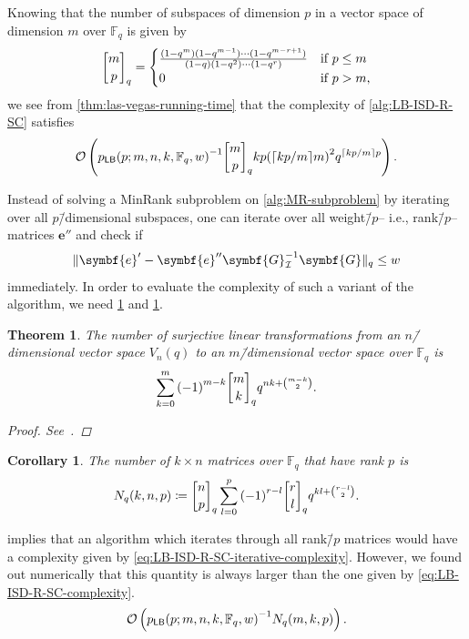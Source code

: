 \documentclass[version=last, paper=A4, parskip=half, oneside]{scrbook}
\theoremstyle{plain}
\newtheorem{theorem}{Theorem}
\newtheorem{corollary}{Corollary}
\theoremstyle{definition}
\theoremstyle{remark}
\renewcommand*{\vec}{\symbf}
\newcommand*{\mat}{\symbf}
\newcommand*{\FF}{\ensuremath{\mathbb{F}}}
\DeclarePairedDelimiter{\ceil}{\lceil}{\rceil}
\DeclarePairedDelimiter{\norm}{\lVert}{\rVert}
\newcommand*{\normR}[2]{\ensuremath{\norm{#1}_{#2}}}
\DeclareRobustCommand{\qbinom}{\genfrac[]{0pt}{}}
\newcommand*{\LB}{\ensuremath{\mathsf{LB}}}
\begin{document}
Knowing that the number of subspaces of dimension \(p\) in a vector space of
dimension \(m\) over \(\FF_q\) is given by
\[
  \qbinom{m}{p}_q =
  \begin{cases}
    \frac{%
      (1 - q^m)(1 - q^{m - 1}) \cdots (1 - q^{m - r + 1})%
    }{%
      (1 - q)(1 - q^2) \cdots (1 - q^r)%
    } & \text{if}\ p \le m \\
    0 & \text{if}\ p > m\text,
  \end{cases}
\]
we see from \cref{thm:las-vegas-running-time} that the complexity of
\cref{alg:LB-ISD-R-SC} satisfies
\begin{equation}\label{eq:LB-ISD-R-SC-complexity}
  \mathcal{O}\left(
    {p_{\LB}(p; m, n, k, \FF_q, w)}^{-1}
    \qbinom{m}{p}_q
    k p {(\ceil{k p / {m}} m)}^2 q^{\ceil{k p / {m}} p}
  \right)\text.
\end{equation}

Instead of solving a MinRank subproblem on \autoref{alg:MR-subproblem} by
iterating over all \(p\)\=/dimensional subspaces, one can iterate over all
weight\=/\(p\)\--- i.e., rank\=/\(p\)\--- matrices \(\vec{e}''\) and check if
\[
  \normR{\vec{e}' - \vec{e}'' \mat{G}_{\mathcal{I}}^{-1} \mat{G}}{q} \le w
\]
immediately.  In order to evaluate the complexity of such a variant of the
algorithm, we need \cref{thm:number-of-surjective-linear-transformations} and
\cref{cor:number-of-matrices-of-given-rank}.

\begin{theorem}\label{thm:number-of-surjective-linear-transformations}
  The number of surjective linear transformations from an \(n\)\=/dimensional
  vector space \(V_n(q)\) to an \(m\)\=/dimensional vector space over \(\FF_q\) is
  \[
    \sum_{k = 0}^m {(-1)}^{m - k} \qbinom{m}{k}_q q^{n k + \binom{m - k}{2}}\text.
  \]
  \begin{proof}
    See~\cite[p.~338]{LW01}.
  \end{proof}
\end{theorem}

\begin{corollary}\label{cor:number-of-matrices-of-given-rank}
  The number of \(k \times n\) matrices over \(\FF_q\) that have rank \(p\) is
  \[
    N_q(k, n, p) \coloneqq
    \qbinom{n}{p}_q \sum_{l = 0}^{p}
    {(-1)}^{r - l} \qbinom{r}{l}_q q^{k l + \binom{r - l}{2}}\text.
  \]
\end{corollary}

 implies that an algorithm which
iterates through all rank\=/\(p\) matrices would have a complexity given by
\cref{eq:LB-ISD-R-SC-iterative-complexity}.  However, we found out numerically
that this quantity is always larger than the one given by
\cref{eq:LB-ISD-R-SC-complexity}.
\begin{equation}\label{eq:LB-ISD-R-SC-iterative-complexity}
  \mathcal{O}\left(
    {p_{\LB}(p; m, n, k, \FF_q, w)}^{-1} N_q(m, k, p)
  \right)\text.
\end{equation}
\end{document}
